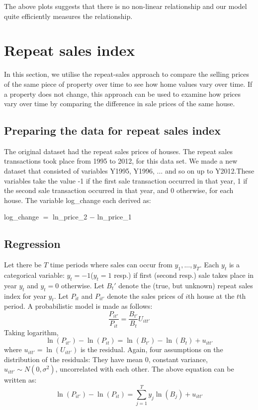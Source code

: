 \documentclass[12pt]{article}
\begin{document}
The above plots suggests that there is no non-linear relationship and our model quite efficiently measures the relationship.

\section{Repeat sales index}
\label{rsi}
In this section, we utilise the repeat-sales approach to compare the selling prices of the same piece of property over time to see how home values vary over time.
If a property does not change, this approach can be used to examine how prices vary over time by comparing the difference in sale prices of the same house.

\subsection{Preparing the data for repeat sales index}
The original dataset had the repeat sales prices of houses. The repeat sales transactions took place from 1995 to 2012, for this data set. We made a new dataset that consisted of variables Y1995, Y1996, ... and so on up to Y2012.These variables take the value -1 if the first sale transaction occurred in that year, 1 if the second sale transaction occurred in that year, and 0 otherwise, for each house. The variable log\_change each derived as:
\begin{center}
    log\_change $=$ ln\_price\_2 $-$ ln\_price\_1
\end{center}
\subsection{Regression}
Let there be $T$ time periods where sales can occur from $y_1, ..., y_T$. Each $y_t$ is a categorical variable: $y_t=-1$($y_t=1$ resp.) if first (second resp.) sale takes place in year $y_t$ and $y_t=0$ otherwise. Let $B_{t}'$ denote the (true, but unknown) repeat sales index for year $y_t$. Let $P_{it}$ and $P_{it'}$ denote the sales prices of $i$th house at the $t$th period. A probabilistic model is made as follows:
$$\frac{P_{it'}}{P_{it}}=\frac{B_{t'}}{B_{t}}U_{itt'}$$
Taking logarithm, 
$$\ln(P_{it'})-\ln(P_{it})=\ln(B_{t'})-\ln(B_{t})+u_{itt'} $$
where $u_{itt'}=\ln(U_{itt'})$ is the residual. Again, four assumptions on the distribution of the residuals: They have mean 0, constant variance, $u_{itt'}\sim N(0, \sigma^2)$, uncorrelated with each other.  The above equation can be written as:
$$\ln(P_{it'})-\ln(P_{it})=\sum_{j=1} ^{T}{y_j \ln(B_{j})} +u_{itt'} $$
\end{document}
